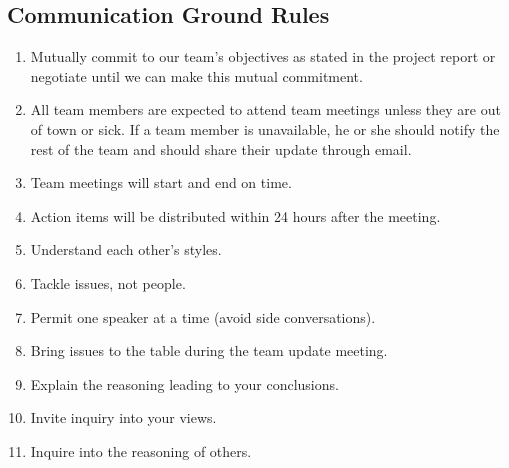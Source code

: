 \documentclass{article}
\begin{document}
\subsection{Communication Ground Rules}
\begin{enumerate}
  \item Mutually commit to our team’s objectives as stated in the project report or negotiate until we can make this mutual commitment.
  \item All team members are expected to attend team meetings unless they are out of town or sick. If a team member is unavailable, he or she should notify the rest of the team and should share their update through email.
  \item Team meetings will start and end on time.
  \item Action items will be distributed within 24 hours after the meeting.
  \item Understand each other’s styles.
  \item Tackle issues, not people.
  \item Permit one speaker at a time (avoid side conversations).
  \item Bring issues to the table during the team update meeting.
  \item Explain the reasoning leading to your conclusions.
  \item Invite inquiry into your views.
  \item Inquire into the reasoning of others.
\end{enumerate}
\end{document}
